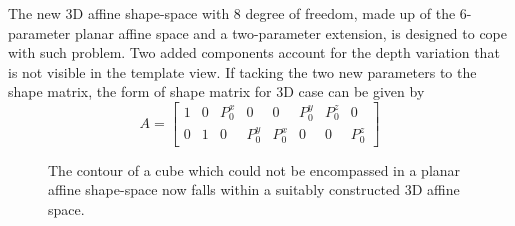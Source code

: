 The new 3D affine shape-space with 8 degree of freedom,
made up of the 6-parameter planar affine space and a two-parameter
extension, is designed to cope with such problem. Two added components
account for the depth variation that is not visible in the template
view. If tacking the two new parameters to the shape matrix, the form
of shape matrix for 3D case can be given by
\begin{equation}
  \label{eq:4.18}
  A =
  \begin{bmatrix}
    1 & 0 & P_0^x & 0 & 0 & P_0^y & P_0^z & 0\\
    0 & 1 & 0 & P_0^y & P_0^x & 0 & 0  & P_0^z
  \end{bmatrix}
\end{equation}

\begin{figure}[htbp]
  \begin{minipage}[t]{0.5\linewidth} 
    \centering 
  \end{minipage}%
  \begin{minipage}[t]{0.5\linewidth} 
    \centering 
  \end{minipage} 
  \caption[Non-planar contour has been successfully fitted]{The
    contour of a cube which could not be encompassed in a planar
    affine shape-space now falls within a suitably constructed 3D affine space.}
\label{fig:box_match}
\end{figure}

